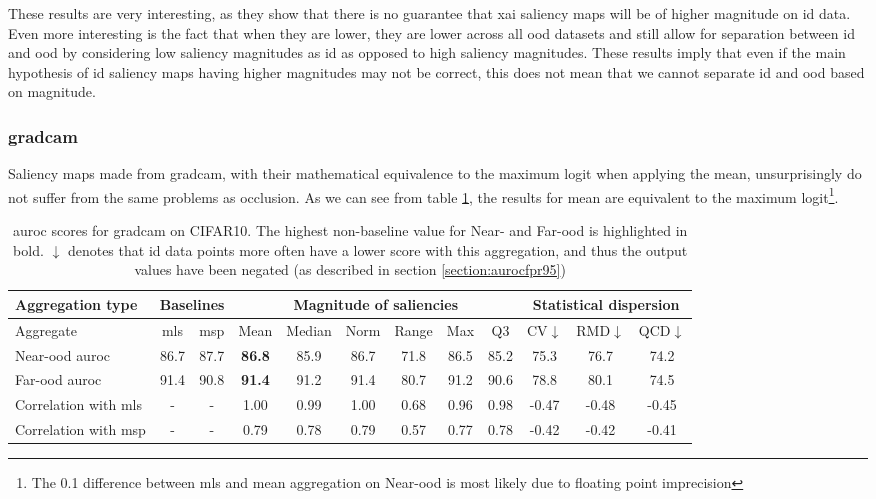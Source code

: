 \documentclass[UKenglish]{uiomasterthesis} %
\theoremstyle{definition}
\begin{document}
These results are very interesting, as they show that there is no guarantee that \ac{xai} saliency maps will be of higher magnitude on \ac{id} data. Even more interesting is the fact that when they are lower, they are lower across all \ac{ood} datasets and still allow for separation between \ac{id} and \ac{ood} by considering low saliency magnitudes as \ac{id} as opposed to high saliency magnitudes. These results imply that even if the main hypothesis of \ac{id} saliency maps having higher magnitudes may not be correct, this does not mean that we cannot separate \ac{id} and \ac{ood} based on magnitude.


\subsubsection{\ac{gradcam}}

Saliency maps made from \ac{gradcam}, with their mathematical equivalence to the maximum logit when applying the mean, unsurprisingly do not suffer from the same problems as occlusion. As we can see from table \ref{table:cifar10_gradcam_metrics}, the results for mean are equivalent to the maximum logit\footnote{The 0.1 difference between \ac{mls} and mean aggregation on Near-\ac{ood} is most likely due to floating point imprecision}.

\begin{table}[H]
\setlength\tabcolsep{3pt}
\begin{center}
\begin{tabular}{ |p{5.1em}|c c|c c c c c c|c c c| }
    \hline
     \centering Aggregation type & \multicolumn{2}{c|}{Baselines} & \multicolumn{6}{c|}{Magnitude of saliencies} & \multicolumn{3}{p{8em}|}{\centering Statistical dispersion} \\
    \hline
    Aggregate & \ac{mls} & \ac{msp} & Mean & Median & Norm & Range & Max & Q3 & CV$\downarrow$ & RMD$\downarrow$ & QCD$\downarrow$  \\
    \hline
    \rowcolor{near!50}
    Near-\ac{ood} \ac{auroc} & 86.7 & 87.7 &\textbf{ 86.8 }& 85.9 & 86.7 & 71.8 & 86.5 & 85.2 & 75.3 & 76.7 & 74.2  \\
    \hline
    \rowcolor{far!50}
    Far-\ac{ood} \ac{auroc} & 91.4 & 90.8 &\textbf{ 91.4 }& 91.2 & 91.4 & 80.7 & 91.2 & 90.6 & 78.8 & 80.1 & 74.5  \\
    \hline
    Correlation with \ac{mls}& - & - & 1.00 & 0.99 & 1.00 & 0.68 & 0.96 & 0.98 & -0.47 & -0.48 & -0.45  \\
    \hline
    Correlation with \ac{msp}& - & - & 0.79 & 0.78 & 0.79 & 0.57 & 0.77 & 0.78 & -0.42 & -0.42 & -0.41  \\
    \hline
    \end{tabular}
    \caption[\ac{auroc} scores for \ac{gradcam} on CIFAR10]{\ac{auroc} scores for \ac{gradcam} on CIFAR10. The highest non-baseline value for Near- and Far-\ac{ood} is highlighted in bold. $\downarrow$ denotes that \ac{id} data points more often have a lower score with this aggregation, and thus the output values have been negated (as described in section \ref{section:aurocfpr95})}
    \label{table:cifar10_gradcam_metrics}
\end{center}
\setlength\tabcolsep{6pt}
\end{table}
\end{document}
